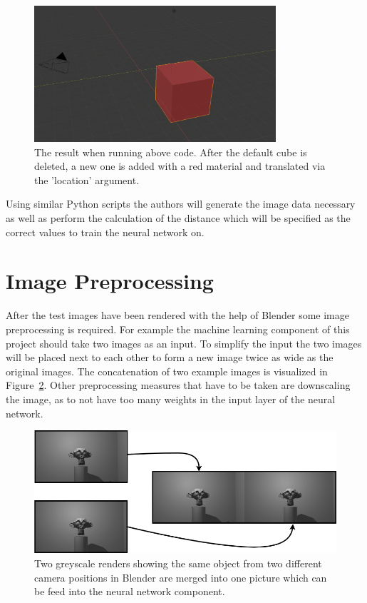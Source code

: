 \begin{figure}[h!]
	\centering
	\includegraphics[width=0.8\textwidth]{img/methodology_generatingData_blender_exampleScriptResult.png}
	\caption{The result when running above code. After the default cube is deleted, a new one is added with a red material and translated via the 'location' argument.}
	\label{pic:methodology_generatingData_blender_exampleScriptResult}
\end{figure}

Using similar Python scripts the authors will generate the image data necessary as well as perform the calculation of the distance which will be specified as the correct values to train the neural network on.

\section{Image Preprocessing}
After the test images have been rendered with the help of Blender some image preprocessing is required. For example the machine learning component of this project should take two images as an input. To simplify the input the two images will be placed next to each other to form a new image twice as wide as the original images. The concatenation of two example images is visualized in Figure~\ref{pic:methodology_imagePreprocessing_imageMerge}. Other preprocessing measures that have to be taken are downscaling the image, as to not have too many weights in the input layer of the neural network.

\begin{figure}[h!]
	\centering
	\includegraphics[width=6.5in]{img/methodology_imagePreprocessing_imageMerge.png}
	\caption{Two greyscale renders showing the same object from two different camera positions in Blender are merged into one picture which can be feed into the neural network component.}
	\label{pic:methodology_imagePreprocessing_imageMerge}
\end{figure}

